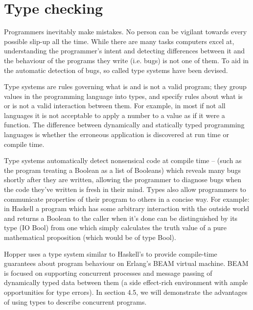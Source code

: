 \section{Type checking}


Programmers inevitably make mistakes. No person can be vigilant towards every possible slip-up all the time. While there are many tasks computers excel at, understanding the programmer’s intent and detecting differences between it and the behaviour of the programs they write (i.e. bugs) is not one of them. To aid in the automatic detection of bugs, so called type systems have been devised.

Type systems are rules governing what is and is not a valid program; they group values in the programming language into types, and specify rules about what is or is not a valid interaction between them. For example, in most if not all languages it is not acceptable to apply a number to a value as if it were a function. The difference between dynamically and statically typed programming languages is whether the erroneous application is discovered at run time or compile time.

Type systems automatically detect nonsensical code at compile time – (such as the program treating a Boolean as a list of Booleans) which reveals many bugs shortly after they are written, allowing the programmer to diagnose bugs when the code they’ve written is fresh in their mind. Types also allow programmers to communicate properties of their program to others in a concise way. For example: in Haskell a program which has some arbitrary interaction with the outside world and returns a Boolean to the caller when it’s done can be distinguished by its type (IO Bool) from one which simply calculates the truth value of a pure mathematical proposition (which would be of type Bool).

Hopper uses a type system similar to Haskell's to provide compile-time guarantees about program behaviour on Erlang's BEAM virtual machine. BEAM is focused on supporting concurrent processes and message passing of dynamically typed data between them (a side effect-rich environment with ample opportunities for type errors). In section 4.5, we will demonstrate the advantages of using types to describe concurrent programs.
